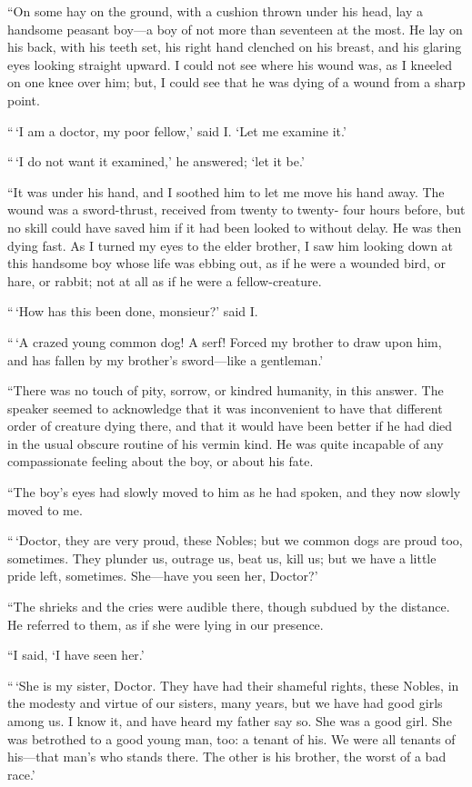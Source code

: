 ``On some hay on the ground, with a cushion thrown under his head, lay
a handsome peasant boy---a boy of not more than seventeen at the most.
He lay on his back, with his teeth set, his right hand clenched on
his breast, and his glaring eyes looking straight upward.  I could
not see where his wound was, as I kneeled on one knee over him;
but, I could see that he was dying of a wound from a sharp point.

``\,`I am a doctor, my poor fellow,' said I. `Let me examine it.'

``\,`I do not want it examined,' he answered; `let it be.'

``It was under his hand, and I soothed him to let me move his hand
away.  The wound was a sword-thrust, received from twenty to twenty-%
four hours before, but no skill could have saved him if it had been
looked to without delay.  He was then dying fast.  As I turned my
eyes to the elder brother, I saw him looking down at this handsome
boy whose life was ebbing out, as if he were a wounded bird, or hare,
or rabbit; not at all as if he were a fellow-creature.

``\,`How has this been done, monsieur?' said I.

``\,`A crazed young common dog!  A serf!  Forced my brother to draw upon him,
and has fallen by my brother's sword---like a gentleman.'

``There was no touch of pity, sorrow, or kindred humanity, in this
answer.  The speaker seemed to acknowledge that it was inconvenient
to have that different order of creature dying there, and that it
would have been better if he had died in the usual obscure routine of
his vermin kind. He was quite incapable of any compassionate feeling
about the boy, or about his fate.

``The boy's eyes had slowly moved to him as he had spoken, and they
now slowly moved to me.

``\,`Doctor, they are very proud, these Nobles; but we common dogs are
proud too, sometimes.  They plunder us, outrage us, beat us, kill us;
but we have a little pride left, sometimes.  She---have you seen her, Doctor?'

``The shrieks and the cries were audible there, though subdued by the
distance.  He referred to them, as if she were lying in our presence.

``I said, `I have seen her.'

``\,`She is my sister, Doctor.  They have had their shameful rights,
these Nobles, in the modesty and virtue of our sisters, many years,
but we have had good girls among us.  I know it, and have heard my
father say so. She was a good girl.  She was betrothed to a good
young man, too:  a tenant of his.  We were all tenants of his---that man's
who stands there. The other is his brother, the worst of a bad race.'

